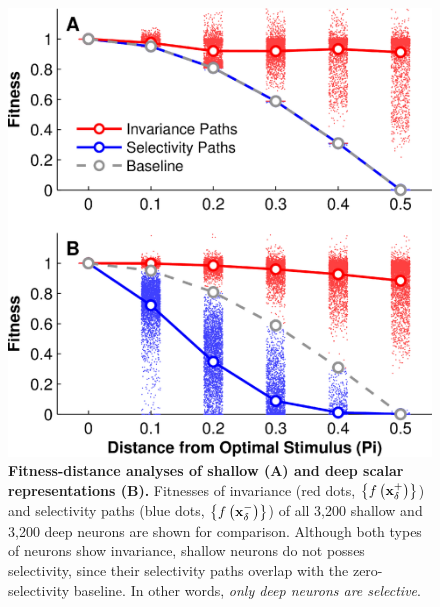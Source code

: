 \documentclass[10pt,twocolumn,letterpaper]{article}
\begin{document}
\begin{figure}
\begin{center}
\includegraphics[width=0.75\columnwidth]{Figs/fig4.pdf} 
\end{center}
\caption{{\bf Fitness-distance analyses of shallow (A) and deep scalar representations (B).}
Fitnesses of invariance (red dots, \ie $\left\lbrace f\left(\bf{x}^{+}_{\delta}\right) \right\rbrace$) and selectivity paths (blue dots, \ie $\left\lbrace f\left(\bf{x}^{-}_{\delta}\right) \right\rbrace$) of all 3,200 shallow and 3,200 deep neurons are shown for comparison\protect\footnotemark.
Although both types of neurons show invariance, shallow neurons do not posses selectivity, since their selectivity paths overlap with the zero-selectivity baseline.
In other words, \emph{only deep neurons are selective}.
} %
\label{fig:fda}
\end{figure}
\end{document}
